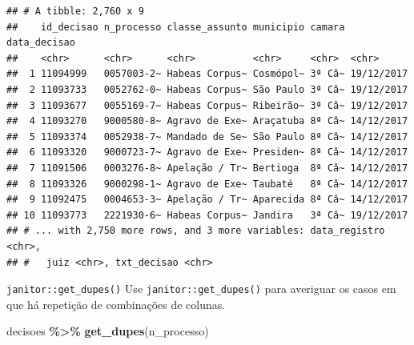 \documentclass[
  9pt,
  ignorenonframetext,
]{beamer}
\newenvironment{Shaded}{\begin{snugshade}}{\end{snugshade}}
\newcommand{\KeywordTok}[1]{\textcolor[rgb]{0.13,0.29,0.53}{\textbf{#1}}}
\newcommand{\NormalTok}[1]{#1}
\newcommand{\OperatorTok}[1]{\textcolor[rgb]{0.81,0.36,0.00}{\textbf{#1}}}
\newcommand{\StringTok}[1]{\textcolor[rgb]{0.31,0.60,0.02}{#1}}
\begin{document}
\begin{frame}[fragile]{}
\protect\hypertarget{section-8}{}
\begin{verbatim}
## # A tibble: 2,760 x 9
##    id_decisao n_processo classe_assunto municipio camara data_decisao
##    <chr>      <chr>      <chr>          <chr>     <chr>  <chr>       
##  1 11094999   0057003-2~ Habeas Corpus~ Cosmópol~ 3ª Câ~ 19/12/2017  
##  2 11093733   0052762-0~ Habeas Corpus~ São Paulo 3ª Câ~ 19/12/2017  
##  3 11093677   0055169-7~ Habeas Corpus~ Ribeirão~ 3ª Câ~ 19/12/2017  
##  4 11093270   9000580-8~ Agravo de Exe~ Araçatuba 8ª Câ~ 14/12/2017  
##  5 11093374   0052938-7~ Mandado de Se~ São Paulo 8ª Câ~ 14/12/2017  
##  6 11093320   9000723-7~ Agravo de Exe~ Presiden~ 8ª Câ~ 14/12/2017  
##  7 11091506   0003276-8~ Apelação / Tr~ Bertioga  8ª Câ~ 14/12/2017  
##  8 11093326   9000298-1~ Agravo de Exe~ Taubaté   8ª Câ~ 14/12/2017  
##  9 11092475   0004653-3~ Apelação / Tr~ Aparecida 8ª Câ~ 14/12/2017  
## 10 11093773   2221930-6~ Habeas Corpus~ Jandira   3ª Câ~ 19/12/2017  
## # ... with 2,750 more rows, and 3 more variables: data_registro <chr>,
## #   juiz <chr>, txt_decisao <chr>
\end{verbatim}
\end{frame}

\begin{frame}[fragile]{\texttt{janitor::get\_dupes()}}
\protect\hypertarget{janitorget_dupes-1}{}
Use \texttt{janitor::get\_dupes()} para averiguar os casos em que há
repetição de combinações de colunas.

\begin{Shaded}
\begin{Highlighting}[]
\NormalTok{decisoes }\OperatorTok{\%\textgreater{}\%}\StringTok{ }
\StringTok{  }\KeywordTok{get\_dupes}\NormalTok{(n\_processo)}
\end{Highlighting}
\end{Shaded}
\end{frame}
\end{document}

